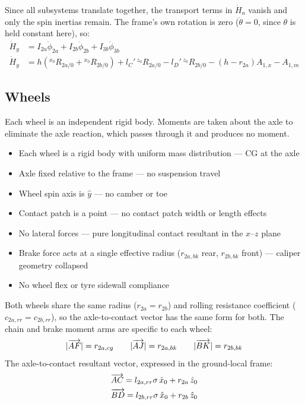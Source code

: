 \begin{aiblock}
Since all subsystems translate together, the transport terms in $\dot{H}_a$ vanish and only the spin inertias remain. The frame's own rotation is zero ($\ddot\theta = 0$, since $\theta$ is held constant here), so:
\begin{align}
    \dot{H}_y &= I_{2a}\ddot{\phi}_{2a} + I_{2b}\ddot{\phi}_{2b} + I_{3b}\ddot{\phi}_{3b} \\
    \dot{H}_y &= h\left({}^{x_0}R_{2a/0} + {}^{x_0}R_{2b/0}\right) + l_C'\,{}^{z_0}R_{2a/0} - l_D'\,{}^{z_0}R_{2b/0}
               - \left(h - r_{2a}\right)A_{1,x} - A_{1,m}
\end{align}

\subsection{Wheels}
Each wheel is an independent rigid body. Moments are taken about the axle to eliminate the axle reaction, which passes through it and produces no moment.

\begin{itemize}
    \item Each wheel is a rigid body with uniform mass distribution --- CG at the axle
    \item Axle fixed relative to the frame --- no suspension travel
    \item Wheel spin axis is $\hat{y}$ --- no camber or toe
    \item Contact patch is a point --- no contact patch width or length effects
    \item No lateral forces --- pure longitudinal contact resultant in the $x$--$z$ plane
    \item Brake force acts at a single effective radius ($r_{2a,bk}$ rear, $r_{2b,bk}$ front) --- caliper geometry collapsed
    \item No wheel flex or tyre sidewall compliance
\end{itemize}

Both wheels share the same radius ($r_{2a}=r_{2b}$) and rolling resistance coefficient ($c_{2a,rr}=c_{2b,rr}$), so the axle-to-contact vector has the same form for both. The chain and brake moment arms are specific to each wheel:
\begin{equation}
    |\overrightarrow{AF}| = r_{2a,cg} \qquad |\overrightarrow{AJ}| = r_{2a,bk} \qquad |\overrightarrow{BK}| = r_{2b,bk}
\end{equation}
The axle-to-contact resultant vector, expressed in the ground-local frame:
\begin{gather}
    \overrightarrow{AC} = l_{2a,rr}\sigma\,\hat{x}_0 + r_{2a}\,\hat{z}_0 \\
    \overrightarrow{BD} = l_{2b,rr}\sigma\,\hat{x}_0 + r_{2b}\,\hat{z}_0
\end{gather}


\end{aiblock}
